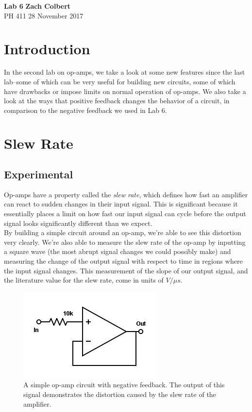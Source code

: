 \documentclass[11pt]{article}
\begin{document}
\noindent
\large\textbf{Lab 6} \hfill \textbf{Zach Colbert} \\
\normalsize PH 411 \hfill 28 November 2017\\

\section*{Introduction}
In the second lab on op-amps, we take a look at some new features since the last lab--some of which can be very useful for building new circuits, some of which have drawbacks or impose limits on normal operation of op-amps. We also take a look at the ways that positive feedback changes the behavior of a circuit, in comparison to the negative feedback we used in Lab 6.\\


\section{Slew Rate}
\subsection{Experimental}

Op-amps have a property called the \emph{slew rate}, which defines how fast an amplifier can react to sudden changes in their input signal. This is significant because it essentially places a limit on how fast our input signal can cycle before the output signal looks significantly different than we expect.\\

By building a simple circuit around an op-amp, we're able to see this distortion very clearly. We're also able to measure the slew rate of the op-amp by inputting a square wave (the most abrupt signal changes we could possibly make) and measuring the change of the output signal with respect to time in regions where the input signal changes. This measurement of the slope of our output signal, and the literature value for the slew rate, come in units of $V / \mu s$.\\

\begin{figure}[H]
    \centering
    \includegraphics[scale=0.5]{Diagrams/c-a.png}
    \caption{A simple op-amp circuit with negative feedback. The output of this signal demonstrates the distortion caused by the slew rate of the amplifier.}
    \label{circuit:a}
\end{figure}
\end{document}
